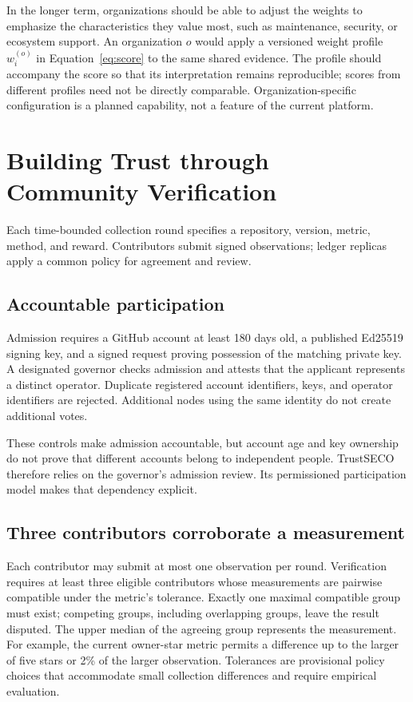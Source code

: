 \documentclass[10pt,conference]{IEEEtran}
\begin{document}
In the longer term, organizations should be able to adjust the weights to emphasize the characteristics they value most, such as maintenance, security, or ecosystem support. An organization $o$ would apply a versioned weight profile $w_i^{(o)}$ in Equation~\ref{eq:score} to the same shared evidence. The profile should accompany the score so that its interpretation remains reproducible; scores from different profiles need not be directly comparable. Organization-specific configuration is a planned capability, not a feature of the current platform.

\section{Building Trust through Community Verification}
\label{sec:community}
Each time-bounded collection round specifies a repository, version, metric, method, and reward. Contributors submit signed observations; ledger replicas apply a common policy for agreement and review.

\subsection{Accountable participation}
Admission requires a GitHub account at least 180 days old, a published Ed25519 signing key, and a signed request proving possession of the matching private key. A designated governor checks admission and attests that the applicant represents a distinct operator. Duplicate registered account identifiers, keys, and operator identifiers are rejected. Additional nodes using the same identity do not create additional votes.

These controls make admission accountable, but account age and key ownership do not prove that different accounts belong to independent people. TrustSECO therefore relies on the governor's admission review. Its permissioned participation model makes that dependency explicit.

\subsection{Three contributors corroborate a measurement}
Each contributor may submit at most one observation per round. Verification requires at least three eligible contributors whose measurements are pairwise compatible under the metric's tolerance. Exactly one maximal compatible group must exist; competing groups, including overlapping groups, leave the result disputed. The upper median of the agreeing group represents the measurement. For example, the current owner-star metric permits a difference up to the larger of five stars or 2\% of the larger observation. Tolerances are provisional policy choices that accommodate small collection differences and require empirical evaluation.
\end{document}

